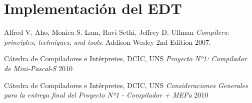 \documentclass[a4paper,oneside]{report}
\begin{document}
\section{Implementación del EDT}


\begin{thebibliography}{9}
  Alfred V. Aho, Monica S. Lam, Ravi Sethi, Jeffrey D. Ullman
  \emph{Compilers: principles, techniques, and tools}.
  Addison Wesley
  2nd Edition
  2007.
  
	Cátedra de Compiladores e Intérpretes, DCIC, UNS
	\emph{Proyecto Nº1: Compilador de Mini-Pascal-S}
	2010
	
	Cátedra de Compiladores e Intérpretes, DCIC, UNS
	\emph{Consideraciones Generales para la entrega final del Proyecto Nº1 - Compilador + MEPa}
	2010

\end{thebibliography}
\end{document}
